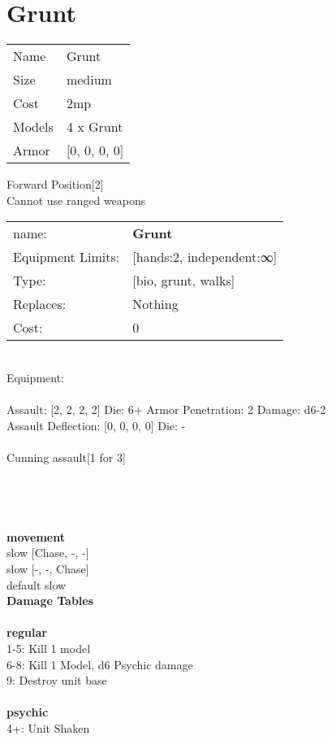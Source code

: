 \pagebreak\pagebreak

\section{ Grunt }

\begin{tabular}{ll}
  Name & Grunt \\
  Size & medium\\
  Cost & 2mp\\
  Models & 4 x Grunt\\
  Armor & [0, 0, 0, 0]\\
\end{tabular}

\noindent Forward Position[2]\\ 
Cannot use ranged weapons\\ 


\noindent
\begin{tabular}{ll}
name: &{\bf Grunt } \\
Equipment Limits: &[hands:2, independent:∞] \\
Type: &[bio, grunt, walks] \\
Replaces: &Nothing \\
Cost: & 0\\
\end{tabular}
\ \\
Equipment:  \\
\ \\
Assault: [2, 2, 2, 2] Die: 6+ Armor Penetration: 2 Damage: d6-2 \\
Assault Deflection: [0, 0, 0, 0] Die: -\\
\\ 
Cunning assault[1 for 3]\\ 
 
\ \\

\ \\
 
\ \\



\ \\ {\bf movement } \\
slow [Chase, -, -] \\
slow [-, -, Chase] \\
default slow \\


{\bf Damage Tables} \\
\ \\ {\bf regular } \\
1-5: Kill 1 model \\
6-8: Kill 1 Model, d6 Psychic damage \\
9: Destroy unit base \\
\ \\ {\bf psychic } \\
4+: Unit Shaken \\











